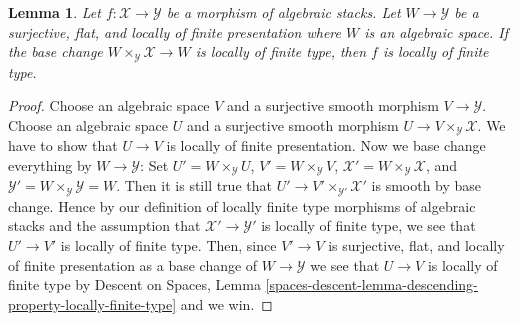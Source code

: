 \documentclass[10pt,a4paper]{amsart}
\theoremstyle{plain}
\newtheorem{lemma}[subsection]{Lemma}
\theoremstyle{definition}
\theoremstyle{remark}
\numberwithin{equation}{subsection}
\begin{document}
\begin{lemma}
\label{lemma-check-finite-type-covering}
Let $f : \mathcal{X} \to \mathcal{Y}$ be a morphism of algebraic stacks.
Let $W \to \mathcal{Y}$ be a surjective, flat, and locally of finite
presentation where $W$ is an algebraic space. If the base change
$W \times_\mathcal{Y} \mathcal{X} \to W$ is
locally of finite type, then $f$ is locally of finite type.
\end{lemma}

\begin{proof}
Choose an algebraic space $V$ and a surjective smooth morphism
$V \to \mathcal{Y}$. Choose an algebraic space $U$ and a surjective
smooth morphism $U \to V \times_\mathcal{Y} \mathcal{X}$.
We have to show that $U \to V$ is locally of finite presentation.
Now we base change everything by $W \to \mathcal{Y}$: Set
$U' = W \times_\mathcal{Y} U$,
$V' = W \times_\mathcal{Y} V$,
$\mathcal{X}' = W \times_\mathcal{Y} \mathcal{X}$,
and $\mathcal{Y}' = W \times_\mathcal{Y} \mathcal{Y} = W$.
Then it is still true that $U' \to V' \times_{\mathcal{Y}'} \mathcal{X}'$
is smooth by base change. Hence by our definition of locally finite type
morphisms of algebraic stacks and the assumption that
$\mathcal{X}' \to \mathcal{Y}'$ is locally of finite type,
we see that $U' \to V'$ is locally of finite type. Then, since
$V' \to V$ is surjective, flat, and locally of finite presentation
as a base change of $W \to \mathcal{Y}$ we see that $U \to V$ is
locally of finite type by
Descent on Spaces, Lemma
\ref{spaces-descent-lemma-descending-property-locally-finite-type}
and we win.
\end{proof}
\end{document}
